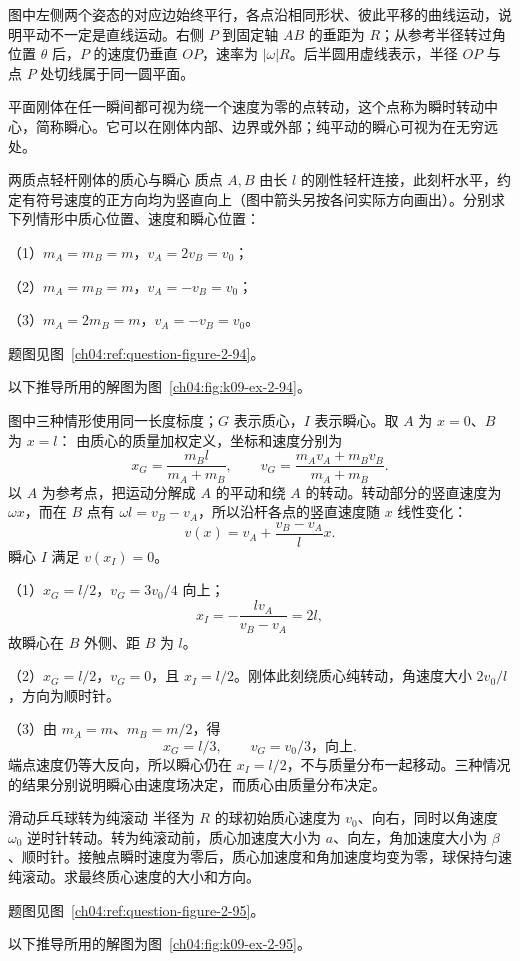 {\RigidMotionTypesDiagram
图中左侧两个姿态的对应边始终平行，各点沿相同形状、彼此平移的曲线运动，说明平动不一定是直线运动。右侧 $P$ 到固定轴 $AB$ 的垂距为 $R$；从参考半径转过角位置 $\theta$ 后，$P$ 的速度仍垂直 $OP$，速率为 $|\omega|R$。后半圆用虚线表示，半径 $OP$ 与点 $P$ 处切线属于同一圆平面。

平面刚体在任一瞬间都可视为绕一个速度为零的点转动，这个点称为瞬时转动中心，简称瞬心。它可以在刚体内部、边界或外部；纯平动的瞬心可视为在无穷远处。


\begin{origexamplebox}{两质点轻杆刚体的质心与瞬心}\label{ch04:ex:k09-2-94}
质点 $A,B$ 由长 $l$ 的刚性轻杆连接，此刻杆水平，约定有符号速度的正方向均为竖直向上（图中箭头另按各问实际方向画出）。分别求下列情形中质心位置、速度和瞬心位置：\par
（1）$m_A=m_B=m$，$v_A=2v_B=v_0$；\par
（2）$m_A=m_B=m$，$v_A=-v_B=v_0$；\par
（3）$m_A=2m_B=m$，$v_A=-v_B=v_0$。
\par 题图见图~\ref{ch04:ref:question-figure-2-94}。
\KQuestionDQ
\end{origexamplebox}
\begin{xesolution}
以下推导所用的解图为图~\ref{ch04:fig:k09-ex-2-94}。

图中三种情形使用同一长度标度；$G$ 表示质心，$I$ 表示瞬心。取 $A$ 为 $x=0$、$B$ 为 $x=l$：
\RigidBarCasesDiagram
由质心的质量加权定义，坐标和速度分别为
\[
x_G=\frac{m_Bl}{m_A+m_B},\qquad
v_G=\frac{m_Av_A+m_Bv_B}{m_A+m_B}.
\]
以 $A$ 为参考点，把运动分解成 $A$ 的平动和绕 $A$ 的转动。转动部分的竖直速度为 $\omega x$，而在 $B$ 点有 $\omega l=v_B-v_A$，所以沿杆各点的竖直速度随 $x$ 线性变化：
\[
v(x)=v_A+\frac{v_B-v_A}{l}x.
\]
瞬心 $I$ 满足 $v(x_I)=0$。

（1）$x_G=l/2$，$v_G=3v_0/4$ 向上；
\[
x_I=-\frac{lv_A}{v_B-v_A}=2l,
\]
故瞬心在 $B$ 外侧、距 $B$ 为 $l$。

（2）$x_G=l/2$，$v_G=0$，且 $x_I=l/2$。刚体此刻绕质心纯转动，角速度大小 $2v_0/l$，方向为顺时针。

（3）由 $m_A=m$、$m_B=m/2$，得
\[
\boxed{x_G=l/3},\qquad \boxed{v_G=v_0/3\text{，向上}}.
\]
端点速度仍等大反向，所以瞬心仍在 $\boxed{x_I=l/2}$，不与质量分布一起移动。三种情况的结果分别说明瞬心由速度场决定，而质心由质量分布决定。
\end{xesolution}


\begin{origexamplebox}{滑动乒乓球转为纯滚动}\label{ch04:ex:k09-2-95}
半径为 $R$ 的球初始质心速度为 $v_0$、向右，同时以角速度 $\omega_0$ 逆时针转动。转为纯滚动前，质心加速度大小为 $a$、向左，角加速度大小为 $\beta$、顺时针。接触点瞬时速度为零后，质心加速度和角加速度均变为零，球保持匀速纯滚动。求最终质心速度的大小和方向。
\par 题图见图~\ref{ch04:ref:question-figure-2-95}。
\KQuestionDR
\end{origexamplebox}
\begin{xesolution}
以下推导所用的解图为图~\ref{ch04:fig:k09-ex-2-95}。


\end{xesolution}}
